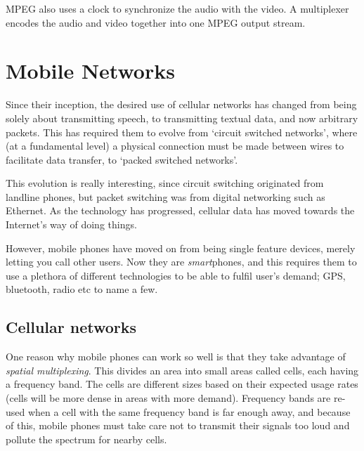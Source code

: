 MPEG also uses a clock to synchronize the audio with the video. A multiplexer
encodes the audio and video together into one MPEG output stream.


\section{Mobile Networks}

Since their inception, the desired use of cellular networks has changed from
being solely about transmitting speech, to transmitting textual data, and now
arbitrary packets. This has required them to evolve from `circuit switched
networks', where (at a fundamental level) a physical connection must be made
between wires to facilitate data transfer, to `packed switched networks'.

This evolution is really interesting, since circuit switching originated from
landline phones, but packet switching was from digital networking such as
Ethernet. As the technology has progressed, cellular data has moved towards the
Internet's way of doing things.

However, mobile phones have moved on from being single feature devices, merely
letting you call other users. Now they are \textit{smart}phones, and this
requires them to use a plethora of different technologies to be able to fulfil
user's demand; GPS, bluetooth, radio etc to name a few.

\subsection{Cellular networks}

One reason why mobile phones can work so well is that they take advantage of
\textit{spatial multiplexing}. This divides an area into small areas called
cells, each having a frequency band. The cells are different sizes based on
their expected usage rates (cells will be more dense in areas with more
demand). Frequency bands are re-used when a cell with the same frequency band is
far enough away, and because of this, mobile phones must take care not to
transmit their signals too loud and pollute the spectrum for nearby cells.


